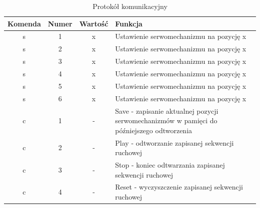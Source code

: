 \documentclass[11pt,titlepage,a4paper]{article}
\begin{document}
\begin{table}[h!]
    \begin{center}
        \begin{tabular}{|c|c|c|m{8cm}|}
            \hline
            Komenda & Numer & Wartość & Funkcja                                                                                   \\
            \hline
            s       & 1     & x       & Ustawienie serwomechanizmu na pozycję x                                                   \\
            \hline
            s       & 2     & x       & Ustawienie serwomechanizmu na pozycję x                                                   \\
            \hline
            s       & 3     & x       & Ustawienie serwomechanizmu na pozycję x                                                   \\
            \hline
            s       & 4     & x       & Ustawienie serwomechanizmu na pozycję x                                                   \\
            \hline
            s       & 5     & x       & Ustawienie serwomechanizmu na pozycję x                                                   \\
            \hline
            s       & 6     & x       & Ustawienie serwomechanizmu na pozycję x                                                   \\
            \hline
            c       & 1     & -       & Save - zapisanie aktualnej pozycji serwomechanizmów w pamięci do późniejszego odtworzenia \\
            \hline
            c       & 2     & -       & Play - odtworzanie zapisanej sekwencji ruchowej                                           \\
            \hline
            c       & 3     & -       & Stop - koniec odtwarzania zapisanej sekwencji ruchowej                                    \\
            \hline
            c       & 4     & -       & Reset - wyczyszczenie zapisanej sekwencji ruchowej                                        \\
            \hline
        \end{tabular}
    \end{center}
    \caption{Protokół komunikacyjny}
    \label{Komunikacja}
\end{table}
\end{document}
